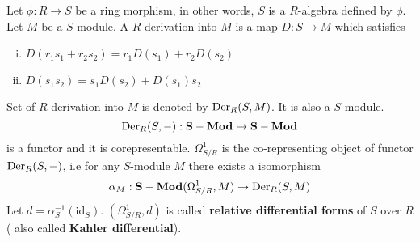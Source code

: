 \begin{mydefn}
Let $\phi: R \rightarrow S$ be a ring morphism, in other words, $S$ is a $R$-algebra defined by $\phi$. Let $M$ be a $S$-module. A $R$-derivation into $M$ is a map $D: S \rightarrow M$ which satisfies
\begin{enumerate}[(i)]
	\item $D(r_1 s_1 + r_2 s_2)=r_1 D(s_1) + r_2 D(s_2)$
	\item $D(s_1 s_2) = s_1 D(s_2) + D(s_1) s_2$
\end{enumerate}
\end{mydefn}
Set of $R$-derivation into $M$ is denoted by $\text{Der}_{R}(S,M)$. It is also a $S$-module.
\[
\text{Der}_{R}(S,-): \mathbf{S-Mod} \rightarrow \mathbf{S-Mod}
\]
 is a functor and it is corepresentable. $\Omega_{S/R}^1$ is the co-representing object of functor $\text{Der}_{R}(S,-)$, i.e for any $S$-module $M$ there exists a isomorphism
 \[
 \alpha_{M}: \mathbf{S-Mod}(\Omega_{S/R}^1,M) \rightarrow \text{Der}_{R}(S,M)
 \]
Let $d= \alpha_{S}^{-1}(\text{id}_{S})$. $(\Omega_{S/R}^1, d)$ is called \textbf{relative differential forms} of $S$ over $R$( also called \textbf{Kahler differential}).

